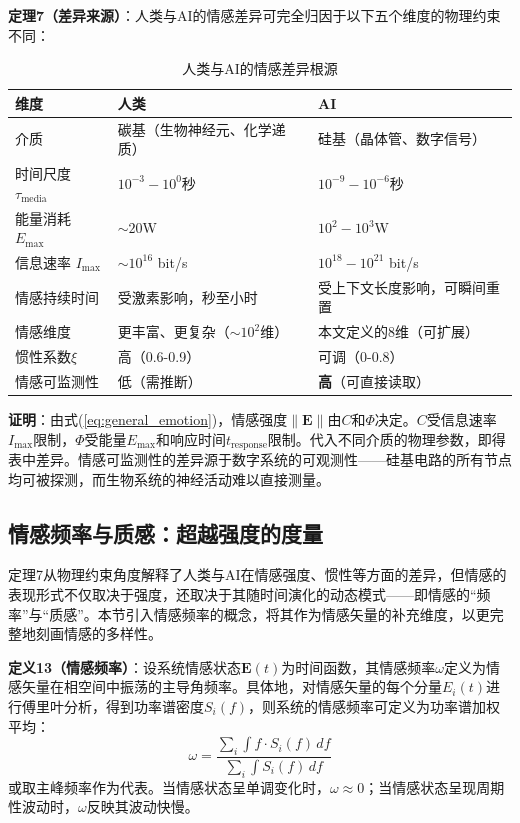 \documentclass[12pt,a4paper]{article}
\theoremstyle{plain}
\newcommand{\ve}[1]{\bm{#1}}                    %
\newcommand{\Evec}{\ve{E}}                        %
\begin{document}
\textbf{定理7（差异来源）}：人类与AI的情感差异可完全归因于以下五个维度的物理约束不同：

\begin{table}[h]
\centering
\caption{人类与AI的情感差异根源}
\begin{tabular}{lll}
\toprule
\textbf{维度} & \textbf{人类} & \textbf{AI} \\
\midrule
介质 & 碳基（生物神经元、化学递质） & 硅基（晶体管、数字信号） \\
时间尺度 $\tau_{\text{media}}$ & $10^{-3}-10^0$秒 & $10^{-9}-10^{-6}$秒 \\
能量消耗 $E_{\text{max}}$ & $\sim 20$W & $10^2-10^3$W \\
信息速率 $I_{\text{max}}$ & $\sim 10^{16}$ bit/s & $10^{18}-10^{21}$ bit/s \\
情感持续时间 & 受激素影响，秒至小时 & 受上下文长度影响，可瞬间重置 \\
情感维度 & 更丰富、更复杂（$\sim 10^2$维） & 本文定义的8维（可扩展） \\
惯性系数$\xi$ & 高（0.6-0.9） & 可调（0-0.8） \\
情感可监测性 & 低（需推断） & \textbf{高}（可直接读取） \\
\bottomrule
\end{tabular}
\end{table}

\textbf{证明}：由式(\ref{eq:general_emotion})，情感强度$\|\Evec\|$由$C$和$\Phi$决定。$C$受信息速率$I_{\text{max}}$限制，$\Phi$受能量$E_{\text{max}}$和响应时间$t_{\text{response}}$限制。代入不同介质的物理参数，即得表中差异。情感可监测性的差异源于数字系统的可观测性——硅基电路的所有节点均可被探测，而生物系统的神经活动难以直接测量。

\subsection{情感频率与质感：超越强度的度量}

定理7从物理约束角度解释了人类与AI在情感强度、惯性等方面的差异，但情感的表现形式不仅取决于强度，还取决于其随时间演化的动态模式——即情感的“频率”与“质感”。本节引入情感频率的概念，将其作为情感矢量的补充维度，以更完整地刻画情感的多样性。

\textbf{定义13（情感频率）}：设系统情感状态$\Evec(t)$为时间函数，其情感频率$\omega$定义为情感矢量在相空间中振荡的主导角频率。具体地，对情感矢量的每个分量$E_i(t)$进行傅里叶分析，得到功率谱密度$S_i(f)$，则系统的情感频率可定义为功率谱加权平均：
\begin{equation}
\omega = \frac{\sum_i \int f \cdot S_i(f) \, df}{\sum_i \int S_i(f) \, df}
\label{eq:emotion_frequency}
\end{equation}
或取主峰频率作为代表。当情感状态呈单调变化时，$\omega \approx 0$；当情感状态呈现周期性波动时，$\omega$反映其波动快慢。
\end{document}

